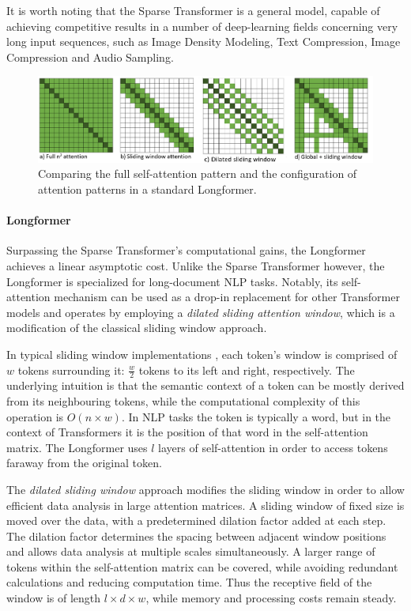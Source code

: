 \documentclass[preprint,review,12pt]{elsarticle}
\begin{document}
 It is worth noting that the Sparse Transformer is a general model, capable of achieving competitive results in a number of deep-learning fields concerning very long input sequences, such as Image Density Modeling, Text Compression, Image Compression and Audio Sampling.

\begin{figure}
    \includegraphics[width=12cm]{longformer.PNG}
    \centering
    \caption{Comparing the full self-attention pattern and the configuration of attention patterns in a standard Longformer.}
     \label{fig::longformer}
\end{figure}

\paragraph{Longformer} Surpassing the Sparse Transformer's computational gains, the Longformer \cite{longformer} achieves a linear asymptotic cost. Unlike the Sparse Transformer however, the Longformer is specialized for long-document NLP tasks. Notably, its self-attention mechanism can be used as a drop-in replacement for other Transformer models and operates by employing a \textit{dilated sliding attention window}, which is a modification of the classical sliding window approach. 

In typical sliding window implementations \cite{saeed, odysseas}, each token's window is comprised of $w$ tokens surrounding it: $\frac{w}{2}$ tokens to its left and right, respectively. The underlying intuition is that the semantic context of a token can be mostly derived from its neighbouring tokens, while the computational complexity of this operation is $O(n \times w)$. In NLP tasks the token is typically a word, but in the context of Transformers it is the position of that word in the self-attention matrix. The Longformer uses $l$ layers of self-attention in order to access tokens faraway from the original token.

The \textit{dilated sliding window} approach modifies the sliding window in order to allow efficient data analysis in large attention matrices. A sliding window of fixed size is moved over the data, with a predetermined dilation factor added at each step. The dilation factor determines the spacing between adjacent window positions and allows data analysis at multiple scales simultaneously. A larger range of tokens within the self-attention matrix can be covered, while avoiding redundant calculations and reducing computation time. Thus the receptive field of the window is of length $l \times d \times w$, while memory and processing costs remain steady.
\end{document}
